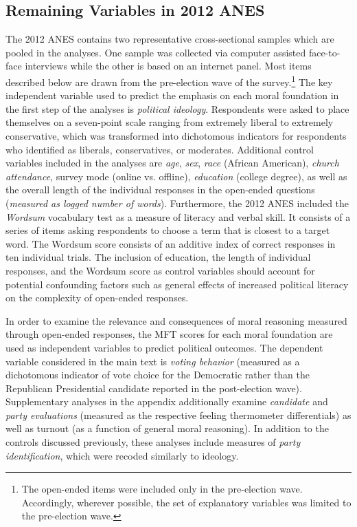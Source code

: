 \documentclass[12pt]{article}
\begin{document}
\subsection{Remaining Variables in 2012 ANES}

The 2012 ANES contains two representative cross-sectional samples which are pooled in the analyses. One sample was collected via computer assisted face-to-face interviews while the other is based on an internet panel. Most items described below are drawn from the pre-election wave of the survey.\footnote{The open-ended items were included only in the pre-election wave. Accordingly, wherever possible, the set of explanatory variables was limited to the pre-election wave.} The key independent variable used to predict the emphasis on each moral foundation in the first step of the analyses is \textit{political ideology}. Respondents were asked to place themselves on a seven-point scale ranging from extremely liberal to extremely conservative, which was transformed into dichotomous indicators for respondents who identified as liberals, conservatives, or moderates. Additional control variables included in the analyses are \textit{age}, \textit{sex}, \textit{race} (African American), \textit{church attendance}, survey mode (online vs. offline), \textit{education} (college degree), as well as the overall length of the individual responses in the open-ended questions (\textit{measured as logged number of words}). Furthermore, the 2012 ANES included the \textit{Wordsum} vocabulary test as a measure of literacy and verbal skill. It consists of a series of items asking respondents to choose a term that is closest to a target word. The Wordsum score consists of an additive index of correct responses in ten individual trials. The inclusion of education, the length of individual responses, and the Wordsum score as control variables should account for potential confounding factors such as general effects of increased political literacy on the complexity of open-ended responses.

In order to examine the relevance and consequences of moral reasoning measured through open-ended responses, the MFT scores for each moral foundation are used as independent variables to predict political outcomes. The dependent variable considered in the main text is \textit{voting behavior} (measured as a dichotomous indicator of vote choice for the Democratic rather than the Republican Presidential candidate reported in the post-election wave). Supplementary analyses in the appendix additionally examine \textit{candidate} and \textit{party evaluations} (measured as the respective feeling thermometer differentials) as well as turnout (as a function of general moral reasoning). In addition to the controls discussed previously, these analyses include measures of \textit{party identification}, which were recoded similarly to ideology.
\end{document}
